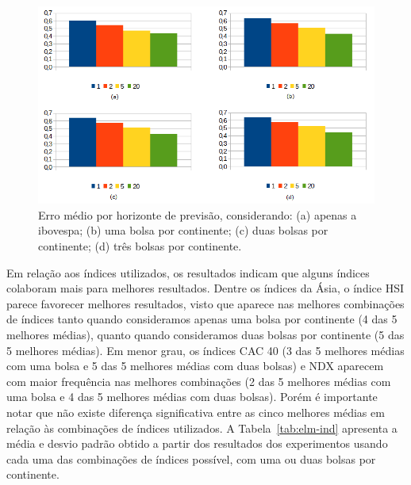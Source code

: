 \documentclass[12pt,a4paper,utf8]{ppgsi}
\begin{document}
     \begin{figure}[htb]
     \centering
     \includegraphics[width=\textwidth]{elm-horizonte.png}
     \caption{Erro médio por horizonte de previsão, considerando: (a) apenas a ibovespa; (b) uma bolsa por continente; (c) duas bolsas por continente; (d) três bolsas por continente. }
     \label{fig:elm-horizonte}
     \end{figure}
  

        Em relação aos índices utilizados, os resultados indicam que alguns índices colaboram mais para melhores resultados. Dentre os índices da Ásia, o índice HSI parece favorecer melhores resultados, visto que aparece nas melhores combinações de índices tanto quando consideramos apenas uma bolsa por continente (4 das 5 melhores médias), quanto quando consideramos duas bolsas por continente (5 das 5 melhores médias). Em menor grau, os índices CAC 40 (3 das 5 melhores médias com uma bolsa e 5 das 5 melhores médias com duas bolsas) e NDX aparecem com maior frequência nas melhores combinações (2 das 5 melhores médias com uma bolsa e 4 das 5 melhores médias com duas bolsas). Porém é importante notar que não existe diferença significativa entre as cinco melhores médias em relação às combinações de índices utilizados. A Tabela~\ref{tab:elm-ind} apresenta a média e desvio padrão obtido a partir dos resultados dos experimentos usando cada uma das combinações de índices possível, com uma ou duas bolsas por continente.
\end{document}
